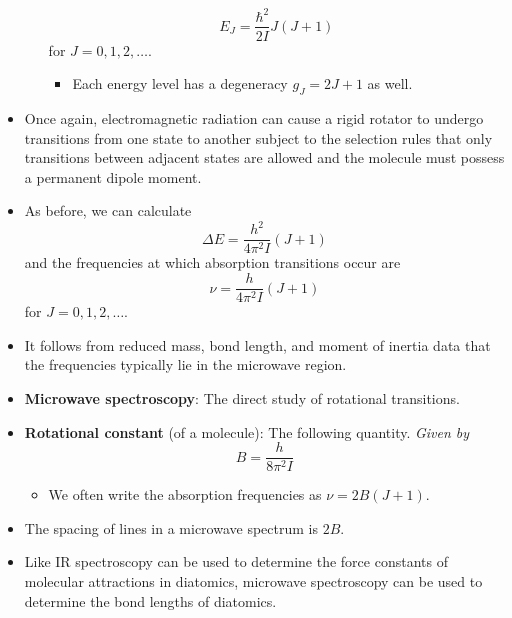 \documentclass[../notes.tex]{subfiles}
\begin{document}
\begin{itemize}
\begin{itemize}
        \begin{equation*}
            E_J = \frac{\hbar^2}{2I}J(J+1)
        \end{equation*}
        for $J=0,1,2,\dots$.
        \begin{itemize}
            \item Each energy level has a degeneracy $g_J=2J+1$ as well.
        \end{itemize}
    \end{itemize}
    \item Once again, electromagnetic radiation can cause a rigid rotator to undergo transitions from one state to another subject to the selection rules that only transitions between adjacent states are allowed and the molecule must possess a permanent dipole moment.
    \item As before, we can calculate
    \begin{equation*}
        \Delta E = \frac{h^2}{4\pi^2I}(J+1)
    \end{equation*}
    and the frequencies at which absorption transitions occur are
    \begin{equation*}
        \nu = \frac{h}{4\pi^2I}(J+1)
    \end{equation*}
    for $J=0,1,2,\dots$.
    \item It follows from reduced mass, bond length, and moment of inertia data that the frequencies typically lie in the microwave region.
    \item \textbf{Microwave spectroscopy}: The direct study of rotational transitions.
    \item \textbf{Rotational constant} (of a molecule): The following quantity. \emph{Given by}
    \begin{equation*}
        B = \frac{h}{8\pi^2I}
    \end{equation*}
    \begin{itemize}
        \item We often write the absorption frequencies as $\nu=2B(J+1)$.
    \end{itemize}
    \item The spacing of lines in a microwave spectrum is $2B$.
    \item Like IR spectroscopy can be used to determine the force constants of molecular attractions in diatomics, microwave spectroscopy can be used to determine the bond lengths of diatomics.
\end{itemize}
\end{document}
